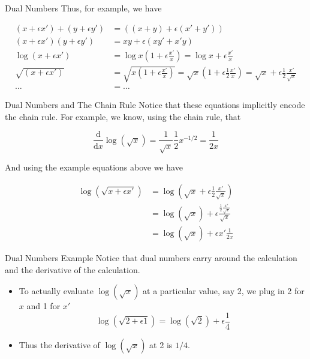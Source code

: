 \documentclass{beamer}
\begin{document}
\begin{frame}[fragile]{Dual Numbers}
Thus, for example, we have

$$
\begin{aligned}
(x + \epsilon x') + (y + \epsilon y') &= ((x + y) + \epsilon (x' + y')) \\
(x + \epsilon x')(y + \epsilon y') &= xy + \epsilon (xy' + x'y) \\
\log (x + \epsilon x') &=
\log x (1 + \epsilon \frac {x'}{x}) =
\log x + \epsilon\frac{x'}{x} \\
\sqrt{(x + \epsilon x')} &=
\sqrt{x(1 + \epsilon\frac{x'}{x})} =
\sqrt{x}(1 + \epsilon\frac{1}{2}\frac{x'}{x}) =
\sqrt{x} + \epsilon\frac{1}{2}\frac{x'}{\sqrt{x}} \\
\ldots &= \ldots
\end{aligned}
$$
\end{frame}

\begin{frame}[fragile]{Dual Numbers and The Chain Rule}
Notice that these equations implicitly encode the chain rule. For
example, we know, using the chain rule, that

$$
\frac{\mathrm{d}}{\mathrm{d} x}\log(\sqrt x) =
\frac{1}{\sqrt x}\frac{1}{2}x^{-1/2} =
\frac{1}{2x}
$$

And using the example equations above we have

$$
\begin{aligned}
\log(\sqrt {x + \epsilon x'}) &= \log (\sqrt{x} + \epsilon\frac{1}{2}\frac{x'}{\sqrt{x}}) \\
                              &= \log (\sqrt{x}) + \epsilon\frac{\frac{1}{2}\frac{x'}{\sqrt{x}}}{\sqrt{x}} \\
                              &= \log (\sqrt{x}) + \epsilon x'\frac{1}{2x}
\end{aligned}
$$
\end{frame}

\begin{frame}[fragile]{Dual Numbers Example}
Notice that dual numbers carry around the calculation and the
derivative of the calculation.

\begin{itemize}
\item
To actually evaluate $\log(\sqrt{x})$
at a particular value, say 2, we plug in 2 for $x$ and 1 for $x'$
$$
\log (\sqrt{2 + \epsilon 1}) = \log(\sqrt{2}) + \epsilon\frac{1}{4}
$$
\item
Thus the derivative of $\log(\sqrt{x})$ at 2 is $1/4$.
\end{itemize}
\end{frame}
\end{document}
